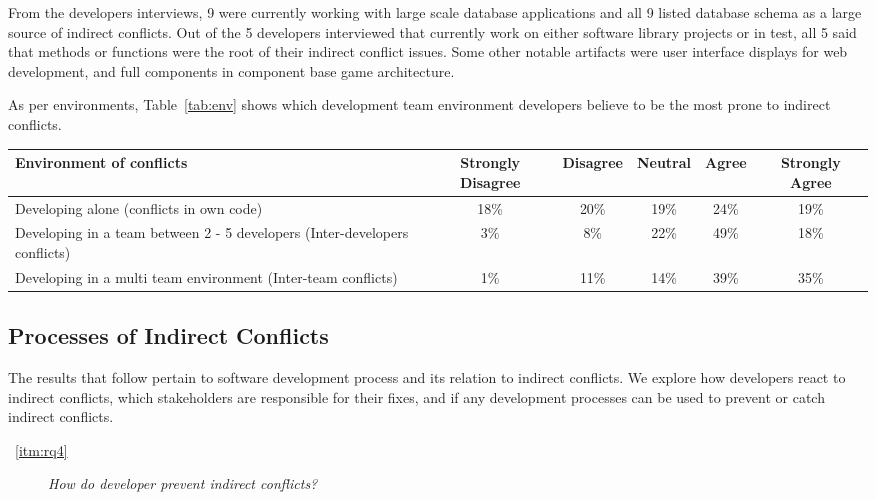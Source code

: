 \documentclass[conference]{IEEEtran}
\begin{document}
From the developers interviews, 9 were currently working with large scale database applications and all 9 listed database
schema as a large source of indirect conflicts. Out of the 5 developers interviewed that currently work on either software
library projects or in test, all 5 said that methods or functions were the root of their indirect conflict issues. Some
other notable artifacts were user interface displays for web development, and full components in component base game
architecture. 

As per environments, Table~\ref{tab:env} shows which development team environment developers believe to be the most
prone to indirect conflicts.

\begin{table*}[tb!]
\begin{center}
\begin{tabular}{| p{7cm} | c | c | c | c | c |}
\hline
Environment of conflicts & Strongly Disagree & Disagree & Neutral & Agree & Strongly Agree \\
\hline
\hline
Developing alone (conflicts in own code) & 18\% & 20\% & 19\% & 24\% & 19\% \\ \hline
Developing in a team between 2 - 5 developers (Inter-developers conflicts) & 3\% & 8\% & 22\% & 49\% & 18\% \\ \hline
Developing in a multi team environment (Inter-team conflicts) & 1\% & 11\% & 14\% & 39\% & 35\% \\ \hline
\end{tabular}
\end{center}
\caption{Results of survey questions to development environments in which indirect conflicts are likely to occur, in terms of percentage
of developers surveyed.\label{tab:env}}
\end{table*}

\subsection{Processes of Indirect Conflicts}

The results that follow pertain to software development process and its relation to indirect conflicts. We explore
how developers react to indirect conflicts, which stakeholders are responsible for their fixes, and if any development
processes can be used to prevent or catch indirect conflicts.

\begin{description}
	\item[~\ref{itm:rq4}] \textit{How do developer prevent indirect conflicts?}
\end{description}
\end{document}
